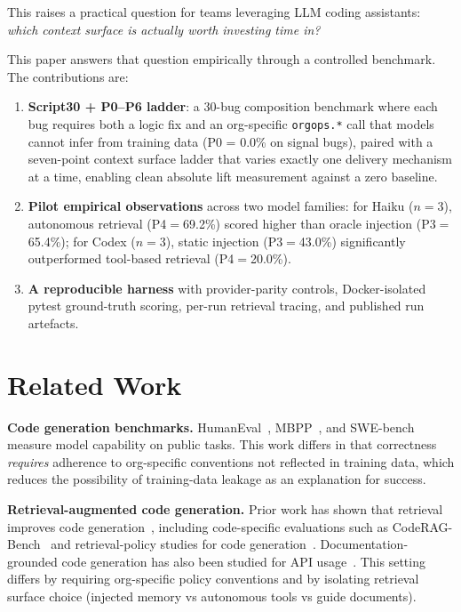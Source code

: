 \documentclass[10pt,a4paper,twocolumn]{article}
\begin{document}
This raises a practical question for teams leveraging LLM coding assistants:
\emph{which context surface is actually worth investing time in?}

This paper answers that question empirically through a controlled benchmark.
The contributions are:

\begin{enumerate}
    \item \textbf{Script30 + P0--P6 ladder}: a 30-bug composition benchmark
    where each bug requires both a logic fix and an org-specific
    \texttt{orgops.*} call that models cannot infer from training data
    (P0 = 0.0\% on signal bugs), paired with a seven-point context surface
    ladder that varies exactly one delivery mechanism at a time, enabling
    clean absolute lift measurement against a zero baseline.
    \item \textbf{Pilot empirical observations} across two model families:
    for Haiku ($n{=}3$), autonomous retrieval (P4$=$69.2\%) scored higher
    than oracle injection (P3$=$65.4\%); for Codex ($n{=}3$), static
    injection (P3$=$43.0\%) significantly outperformed tool-based retrieval
    (P4$=$20.0\%).
    \item \textbf{A reproducible harness} with provider-parity controls,
    Docker-isolated pytest ground-truth scoring, per-run retrieval tracing,
    and published run artefacts.
\end{enumerate}

\section{Related Work}
\label{sec:related-work}

\textbf{Code generation benchmarks.}
HumanEval~\citep{chen2021evaluating}, MBPP~\citep{austin2021program}, and
SWE-bench~\citep{jimenez2024swebench} measure model capability on public
tasks. This work differs in that correctness \emph{requires} adherence to
org-specific conventions not reflected in training data, which reduces the
possibility of training-data leakage as an explanation for success.

\textbf{Retrieval-augmented code generation.}
Prior work has shown that retrieval improves code
generation~\citep{lewis2020retrieval}, including code-specific evaluations
such as CodeRAG-Bench~\citep{wang2024coderagbench} and retrieval-policy
studies for code generation~\citep{gu2025whattoretrieve}.
Documentation-grounded code generation has also been studied for API
usage~\citep{chen2025apidocrag}.
This setting differs by requiring org-specific policy conventions and by
isolating retrieval surface choice (injected memory vs autonomous tools vs
guide documents).
\end{document}
